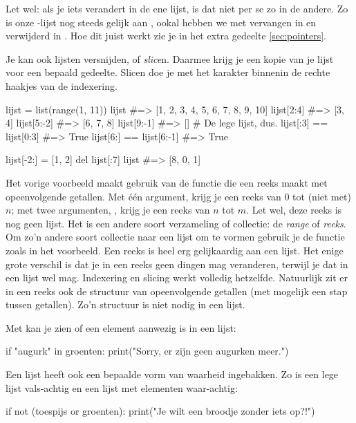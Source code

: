   Let wel: als je iets verandert in de ene lijst, is dat niet per se zo in de
  andere. Zo is onze -lijst nog steeds gelijk aan , ookal hebben we
   met  vervangen in  en
   verwijderd in . Hoe dit juist werkt zie je in het
  extra gedeelte \ref{sec:pointers}.

  Je kan ook lijsten versnijden, of \emph{slice}n. Daarmee krijg je een kopie
  van je lijst voor een bepaald gedeelte. Slicen doe je met het karakter \py{:}
  binnenin de rechte haakjes van de indexering.
  \begin{python}
    lijst = list(range(1, 11))
    lijst            #=> [1, 2, 3, 4, 5, 6, 7, 8, 9, 10]
    lijst[2:4]       #=> [3, 4]
    lijst[5:-2]      #=> [6, 7, 8]
    lijst[9:-1]      #=> []  # De lege lijst, dus.
    lijst[:3] == lijst[0:3]  #=> True
    lijst[6:] == lijst[6:-1] #=> True

    lijst[-2:] = [1, 2]
    del lijst[:7]
    lijst            #=> [8, 0, 1]
  \end{python}
  Het vorige voorbeeld maakt gebruik van de functie  die een reeks
  maakt met opeenvolgende getallen. Met \'e\'en argument,  krijg je
  een reeks van $0$ tot (niet met) $n$; met twee argumenten, ,
  krijg je een reeks van $n$ tot $m$. Let wel, deze reeks is nog geen lijst. Het
  is een andere soort verzameling of collectie: de \emph{range} of \emph{reeks}.
  Om zo'n andere soort collectie naar een lijst om te vormen gebruik je de
  functie  zoals in het voorbeeld. Een reeks is heel erg gelijkaardig
  aan een lijst. Het enige grote verschil is dat je in een reeks geen dingen mag
  veranderen, terwijl je dat in een lijst wel mag. Indexering en slicing werkt
  volledig hetzelfde. Natuurlijk zit er in een reeks ook de structuur van
  opeenvolgende getallen (met mogelijk een stap tussen getallen). Zo'n structuur
  is niet nodig in een lijst.

  Met  kan je zien of een element aanwezig is in een lijst:
  \begin{python}
    if "augurk" in groenten:
      print("Sorry, er zijn geen augurken meer.")
  \end{python}

  Een lijst heeft ook een bepaalde vorm van waarheid ingebakken. Zo is een lege
  lijst vals-achtig en een lijst met elementen waar-achtig:
  \begin{python}
    if not (toespijs or groenten):
      print("Je wilt een broodje zonder iets op?!")
  \end{python}

